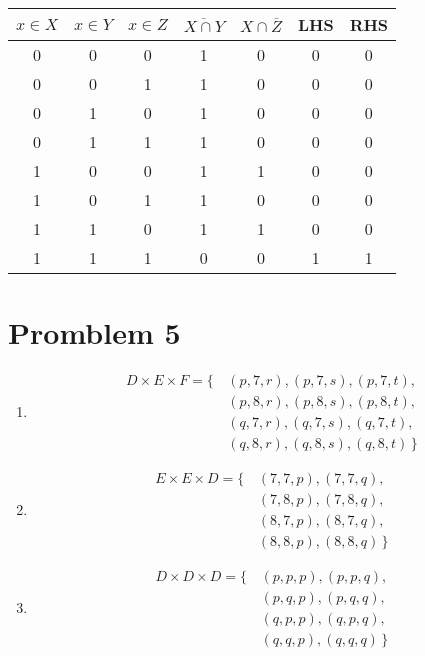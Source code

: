 \documentclass{article}
\begin{document}
\begin{enumerate}
    \renewcommand{\arraystretch}{1.2}
    \begin{center}
    \begin{tabular}{|c|c|c||c|c||c|c|}
    \hline
    $x \in X$ & $x \in Y$ & $x \in Z$ & $\overline{X \cap Y}$ & $X \cap \overline{Z}$ & LHS & RHS \\
    \hline
    0 & 0 & 0 & 1 & 0 & 0 & 0 \\
    0 & 0 & 1 & 1 & 0 & 0 & 0 \\
    0 & 1 & 0 & 1 & 0 & 0 & 0 \\
    0 & 1 & 1 & 1 & 0 & 0 & 0 \\
    1 & 0 & 0 & 1 & 1 & 0 & 0 \\
    1 & 0 & 1 & 1 & 0 & 0 & 0 \\
    1 & 1 & 0 & 1 & 1 & 0 & 0 \\
    1 & 1 & 1 & 0 & 0 & 1 & 1 \\
    \hline
    \end{tabular}
    \end{center}
    
\end{enumerate}

\section*{Promblem 5}
\begin{enumerate}
    \item 
    \begin{align*}
    D \times E \times F = \{\, & (p,7,r), (p,7,s), (p,7,t), \\
                              & (p,8,r), (p,8,s), (p,8,t), \\
                              & (q,7,r), (q,7,s), (q,7,t), \\
                              & (q,8,r), (q,8,s), (q,8,t) \,\}
    \end{align*}

    \item
    \begin{align*}
    E \times E \times D = \{\, & (7,7,p), (7,7,q), \\
                              & (7,8,p), (7,8,q), \\
                              & (8,7,p), (8,7,q), \\
                              & (8,8,p), (8,8,q) \,\}
    \end{align*}

    \item
    \begin{align*}
    D \times D \times D = \{\, & (p,p,p), (p,p,q), \\
                              & (p,q,p), (p,q,q), \\
                              & (q,p,p), (q,p,q), \\
                              & (q,q,p), (q,q,q) \,\}
    \end{align*}
    

\end{enumerate}
\end{document}

